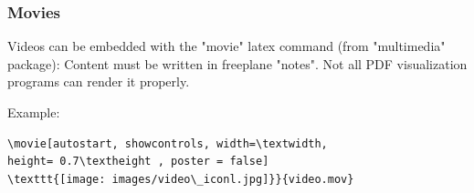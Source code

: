 \documentclass[usepdftitle=false,professionalfonts,compress ]{beamer}
\begin{document}
{
\begin{frame}[fragile]\frametitle{Movies}

Videos can be embedded with the "movie" latex command (from "multimedia" package): Content must be written in freeplane "notes". Not all PDF visualization programs can render it properly.

Example:
\begin{verbatim}
\movie[autostart, showcontrols, width=\textwidth,
height= 0.7\textheight , poster = false]
\texttt{[image: images/video\_iconl.jpg]}}{video.mov}
\end{verbatim}




\end{frame}
}
\end{document}
